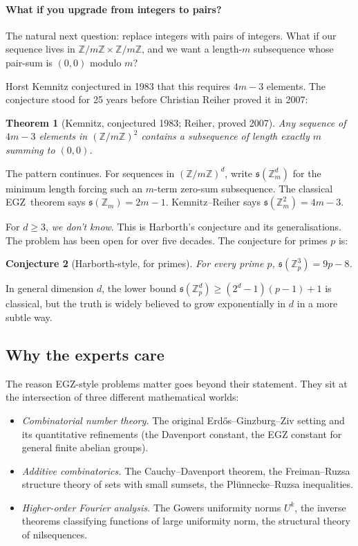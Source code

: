 \documentclass[11pt,a4paper]{article}
\theoremstyle{plain}
\newtheorem{theorem}{Theorem}[section]
\newtheorem{conjecture}[theorem]{Conjecture}
\theoremstyle{definition}
\theoremstyle{remark}
\newcommand{\Z}{\mathbb{Z}}
\newcommand{\sUFp}{\mathfrak{s}}
\newcommand{\EGZ}{\textsf{EGZ}}
\begin{document}
\paragraph{What if you upgrade from integers to pairs?}
The natural next question: replace integers with pairs of integers.
What if our sequence lives in $\Z/m\Z \times \Z/m\Z$, and we want a
length-$m$ subsequence whose pair-sum is $(0, 0)$ modulo $m$?

Horst Kemnitz conjectured in 1983 that this requires $4m - 3$ elements.
The conjecture stood for 25 years before Christian Reiher proved it in
2007:

\begin{theorem}[Kemnitz, conjectured 1983; Reiher, proved 2007]
\label{thm:kemnitz}
Any sequence of $4m - 3$ elements in $(\Z/m\Z)^2$ contains a subsequence of length exactly $m$ summing to $(0, 0)$.
\end{theorem}

The pattern continues. For sequences in $(\Z/m\Z)^d$, write
$\sUFp(\Z_m^d)$ for the minimum length forcing such an $m$-term zero-sum
subsequence. The classical \EGZ\ theorem says $\sUFp(\Z_m) = 2m - 1$.
Kemnitz--Reiher says $\sUFp(\Z_m^2) = 4m - 3$.

For $d \geq 3$, \emph{we don't know}. This is Harborth's conjecture and
its generalisations. The problem has been open for over five decades.
The conjecture for primes $p$ is:

\begin{conjecture}[Harborth-style, for primes]
\label{conj:harborth}
For every prime $p$, $\sUFp(\Z_p^3) = 9p - 8$.
\end{conjecture}

In general dimension $d$, the lower bound $\sUFp(\Z_p^d) \geq (2^d - 1)(p - 1) + 1$ is classical, but the truth is widely believed to grow exponentially in $d$ in a more subtle way.

\subsection{Why the experts care}

The reason \EGZ-style problems matter goes beyond their statement. They sit at the intersection of three different mathematical worlds:

\begin{itemize}[leftmargin=2em]
  \item \emph{Combinatorial number theory.} The original Erd\H{o}s--Ginzburg--Ziv setting and its quantitative refinements (the Davenport constant, the EGZ constant for general finite abelian groups).
  \item \emph{Additive combinatorics.} The Cauchy--Davenport theorem, the Freiman--Ruzsa structure theory of sets with small sumsets, the Plünnecke--Ruzsa inequalities.
  \item \emph{Higher-order Fourier analysis.} The Gowers uniformity norms $U^k$, the inverse theorems classifying functions of large uniformity norm, the structural theory of nilsequences.
\end{itemize}
\end{document}
